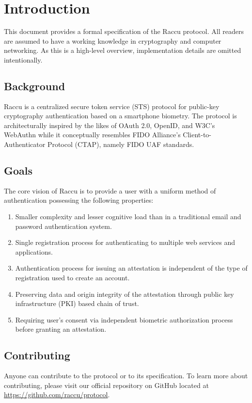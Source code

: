 \section{Introduction}
This document provides a formal specification of the Raccu protocol. All readers are assumed to have a working 
knowledge in cryptography and computer networking. As this is a high-level overview, implementation details are 
omitted intentionally.

    \subsection{Background}
    Raccu is a centralized secure token service (STS) protocol for public-key cryptography authentication 
    based on a smartphone biometry. The protocol is architecturally inspired by the likes of OAuth 2.0, OpenID, 
    and W3C's WebAuthn while it conceptually resembles FIDO Alliance's Client-to-Authenticator Protocol (CTAP), 
    namely FIDO UAF standards.

    \subsection{Goals}
    The core vision of Raccu is to provide a user with a uniform method of authentication possessing the 
    following properties: 
        \begin{enumerate}
            \item Smaller complexity and lesser cognitive load than in a traditional email and password 
                  authentication system.
            \item Single registration process for authenticating to multiple web services and applications.
            \item Authentication process for issuing an attestation is independent of the type of registration 
                  used to create an account.
            \item Preserving data and origin integrity of the attestation through public key infrastructure (PKI) 
                  based chain of trust.
            \item Requiring user's consent via independent biometric authorization process before granting an 
                  attestation.
        \end{enumerate}

     \subsection{Contributing}
     Anyone can contribute to the protocol or to its specification. To learn more about contributing, please visit our 
     official repository on GitHub located at \href{https://github.com/raccu/protocol}{https://github.com/raccu/protocol}.

